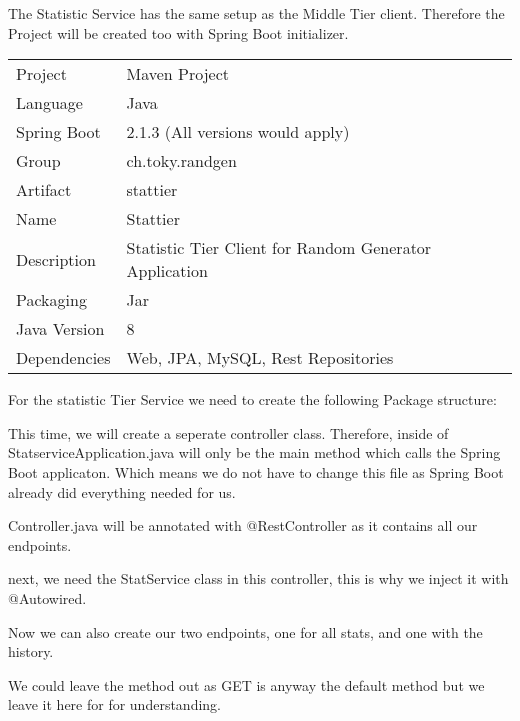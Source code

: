 The Statistic Service has the same setup as the Middle Tier client.
Therefore the Project will be created too with Spring Boot initializer.
\begin{tabbing}
\begin{tabular}{ll}
Project & Maven Project \\
Language & Java \\
Spring Boot & 2.1.3 (All versions would apply) \\
Group & ch.toky.randgen \\
Artifact & stattier \\
Name & Stattier \\
Description & Statistic Tier Client for Random Generator Application \\
Packaging & Jar \\
Java Version & 8 \\
Dependencies & Web, JPA, MySQL, Rest Repositories
\end{tabular}
\end{tabbing}

For the statistic Tier Service we need to create the following Package structure:

This time, we will create a seperate controller class. Therefore, inside of StatserviceApplication.java will only be the main method which calls the Spring Boot applicaton. Which means we do not have to change this file as Spring Boot already did everything needed for us.

Controller.java will be annotated with @RestController as it contains all our endpoints.

next, we need the StatService class in this controller, this is why we inject it with @Autowired.

\newpage
Now we can also create our two endpoints, one for all stats, and one with the history.


We could leave the method out as GET is anyway the default method but we leave it here for for understanding.

